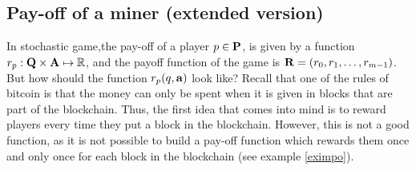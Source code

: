 \iffalse

\subsection{Pay-off of a miner (extended version)}



In stochastic game,the pay-off of a player $p \in \mathbf{P}$, is given by a function $r_p: \mathbf{Q} \times \mathbf{A} \mapsto \mathbb{R}$, and the payoff function of the game is $\mathbf{R} = (r_0, r_1, \ldots, r_{m-1})$.
But how should the function $r_p(q,\mathbf{a})$ look like? Recall that one of the rules of bitcoin is that the money can only 
be spent when it is given in blocks that are part of the blockchain. Thus, the first idea that comes into mind is to 
reward players every time they put a block in the blockchain. However, this is not a good function, as it is not possible to build a pay-off function which rewards them once and only once for each block in the blockchain (see example \ref{eximpo}).


